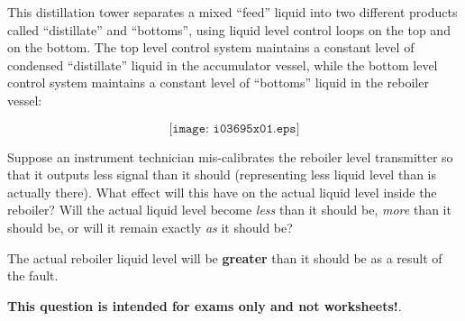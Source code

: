 

This distillation tower separates a mixed ``feed'' liquid into two different products called ``distillate'' and ``bottoms'', using liquid level control loops on the top and on the bottom.  The top level control system maintains a constant level of condensed ``distillate'' liquid in the accumulator vessel, while the bottom level control system maintains a constant level of ``bottoms'' liquid in the reboiler vessel:

$$\texttt{[image: i03695x01.eps]}$$

Suppose an instrument technician mis-calibrates the reboiler level transmitter so that it outputs less signal than it should (representing less liquid level than is actually there).  What effect will this have on the actual liquid level inside the reboiler?  Will the actual liquid level become {\it less} than it should be, {\it more} than it should be, or will it remain exactly {\it as} it should be?







The actual reboiler liquid level will be {\bf greater} than it should be as a result of the fault.







{\bf This question is intended for exams only and not worksheets!}.



